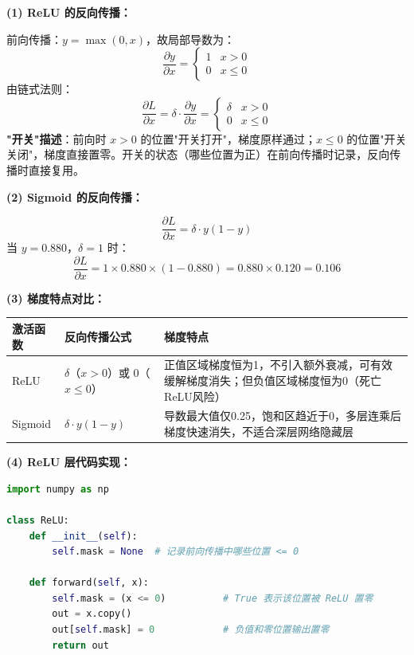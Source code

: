 \documentclass[a4paper,11pt]{ctexart}
\begin{document}
\begin{solutionbox}[参考答案与详细解析]
    \textbf{(1) ReLU 的反向传播：}

    前向传播：$y = \max(0, x)$，故局部导数为：
    \[
    \frac{\partial y}{\partial x} = \begin{cases} 1 & x > 0 \\ 0 & x \leq 0 \end{cases}
    \]
    由链式法则：
    \[
    \frac{\partial L}{\partial x} = \delta \cdot \frac{\partial y}{\partial x} = \begin{cases} \delta & x > 0 \\ 0 & x \leq 0 \end{cases}
    \]
    \textbf{"开关"描述}：前向时 $x>0$ 的位置"开关打开"，梯度原样通过；$x\leq0$ 的位置"开关关闭"，梯度直接置零。开关的状态（哪些位置为正）在前向传播时记录，反向传播时直接复用。

    \textbf{(2) Sigmoid 的反向传播：}

    \[
    \frac{\partial L}{\partial x} = \delta \cdot y(1-y)
    \]
    当 $y=0.880$，$\delta=1$ 时：
    \[
    \frac{\partial L}{\partial x} = 1 \times 0.880 \times (1-0.880) = 0.880 \times 0.120 = \boxed{0.106}
    \]

    \textbf{(3) 梯度特点对比：}

    \begin{center}
    \begin{tabular}{p{2.0cm} p{4.0cm} p{4.3cm}}
        \toprule
        激活函数 & 反向传播公式 & 梯度特点 \\
        \midrule
        ReLU & $\delta$（$x>0$）或 $0$（$x\leq0$） & 正值区域梯度恒为1，不引入额外衰减，可有效缓解梯度消失；但负值区域梯度恒为0（死亡ReLU风险） \\[1em]
        Sigmoid & $\delta \cdot y(1-y)$ & 导数最大值仅0.25，饱和区趋近于0，多层连乘后梯度快速消失，不适合深层网络隐藏层 \\
        \bottomrule
    \end{tabular}
    \end{center}

    \textbf{(4) ReLU 层代码实现：}

    \begin{lstlisting}[language=Python]
import numpy as np

class ReLU:
    def __init__(self):
        self.mask = None  # 记录前向传播中哪些位置 <= 0

    def forward(self, x):
        self.mask = (x <= 0)          # True 表示该位置被 ReLU 置零
        out = x.copy()
        out[self.mask] = 0            # 负值和零位置输出置零
        return out


\end{lstlisting}
\end{solutionbox}
\end{document}
